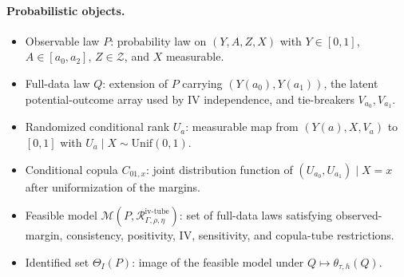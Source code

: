 \documentclass[11pt]{article}
\theoremstyle{definition}
\theoremstyle{plain}
\theoremstyle{remark}
\begin{document}
\paragraph{Probabilistic objects.}
\begin{itemize}[leftmargin=*]
\item Observable law \(P\): probability law on \((Y,A,Z,X)\) with \(Y\in[0,1]\), \(A\in[a_0,a_2]\), \(Z\in\mathcal Z\), and \(X\) measurable.
\item Full-data law \(Q\): extension of \(P\) carrying \((Y(a_0),Y(a_1))\), the latent potential-outcome array used by IV independence, and tie-breakers \(V_{a_0},V_{a_1}\).
\item Randomized conditional rank \(U_a\): measurable map from \((Y(a),X,V_a)\) to \([0,1]\) with \(U_a\mid X\sim\mathrm{Unif}(0,1)\).
\item Conditional copula \(C_{01,x}\): joint distribution function of \((U_{a_0},U_{a_1})\mid X=x\) after uniformization of the margins.
\item Feasible model \(\mathcal M(P,\mathcal R_{\Gamma,\rho,\eta}^{\mathrm{iv\text{-}tube}})\): set of full-data laws satisfying observed-margin, consistency, positivity, IV, sensitivity, and copula-tube restrictions.
\item Identified set \(\Theta_I(P)\): image of the feasible model under \(Q\mapsto\theta_{\tau,h}(Q)\).
\end{itemize}
\end{document}
